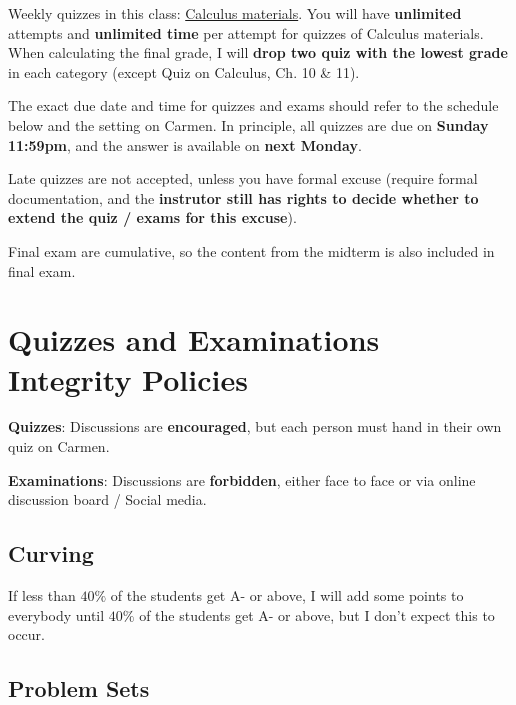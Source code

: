 \documentclass[12pt]{article}
\begin{document}
Weekly quizzes in this class: \underline{Calculus materials}.
You will have \textbf{unlimited} attempts and \textbf{unlimited time} per attempt for quizzes of Calculus materials.
When calculating the final grade, I will \textbf{drop two quiz with the lowest grade} in each category (except Quiz on Calculus, Ch. 10 \& 11).

The exact due date and time for quizzes and exams should refer to the schedule below and the setting on Carmen.
In principle, all quizzes are due on \textbf{Sunday 11:59pm}, and the answer is available on \textbf{next Monday}.

Late quizzes are not accepted, unless you have formal excuse (require formal documentation, and the \textbf{instrutor still has rights to decide whether to extend the quiz / exams for this excuse}).

Final exam are cumulative, so the content from the midterm is also included in final exam.

\section*{Quizzes and Examinations Integrity Policies}

\textbf{Quizzes}: Discussions are \textbf{encouraged}, but each person must hand in their own quiz on Carmen.

\textbf{Examinations}: Discussions are \textbf{forbidden}, either face to face or via online discussion board / Social media.



\subsection*{Curving}

If less than $40\%$ of the students get A- or above, I will add some points to everybody until $40\%$ of the students get A- or above, but I don’t expect this to occur.

\subsection*{Problem Sets}
\label{sub:Problem_Sets}
\end{document}
